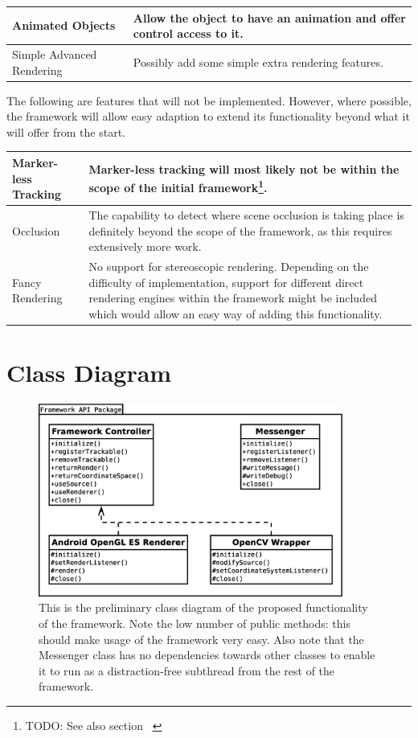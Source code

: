 \begin{tabulary}{\textwidth}{L || L}
Animated Objects & Allow the object to have an animation and offer control access to it.\\
\hline
Simple Advanced Rendering & Possibly add some simple extra rendering features.\\
\end{tabulary}

The following are features that will not be implemented.
However, where possible, the framework will allow easy adaption to extend its functionality beyond what it will offer from the start.

\begin{tabulary}{\textwidth}{L || L}
Marker-less Tracking & Marker-less tracking will most likely not be within the scope of the initial framework\footnote{TODO: See also section ~ }.\\
\hline
Occlusion & The capability to detect where scene occlusion is taking place is definitely beyond the scope of the framework, as this requires extensively more work.\\
\hline
Fancy Rendering & No support for stereoscopic rendering. Depending on the difficulty of implementation, support for different direct rendering engines within the framework might be included which would allow an easy way of adding this functionality.\\
\end{tabulary}

\section{Class Diagram}

\begin{figure}
	\centering
	\includegraphics[width=10cm]{img/class_diagram.eps}
	\caption[TODO General Class Diagram]{This is the preliminary class diagram of the proposed functionality of the framework. Note the low number of public methods: this should make usage of the framework very easy. Also note that the Messenger class has no dependencies towards other classes to enable it to run as a distraction-free subthread from the rest of the framework.}
	\label{fig:class_diagram}
\end{figure}

